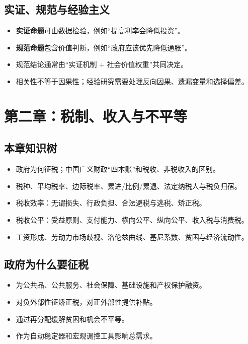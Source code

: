 \documentclass[UTF8,11pt,a4paper]{ctexart}
\newcommand{\term}[1]{\textbf{#1}}
\begin{document}
\subsection{实证、规范与经验主义}
\begin{itemize}
  \item \term{实证命题}可由数据检验，例如“提高利率会降低投资”。
  \item \term{规范命题}包含价值判断，例如“政府应该优先降低通胀”。
  \item 规范结论通常由“实证机制 + 社会价值权重”共同决定。
  \item 相关性不等于因果性；经验研究需要处理反向因果、遗漏变量和选择偏差。
\end{itemize}

\newpage
\section{第二章：税制、收入与不平等}

\subsection{本章知识树}
\begin{itemize}
  \item 政府为何征税；中国广义财政“四本账”和税收、非税收入的区别。
  \item 税种、平均税率、边际税率、累进/比例/累退、法定纳税人与税负归宿。
  \item 税收效率：无谓损失、行政负担、合法避税与逃税、矫正税。
  \item 税收公平：受益原则、支付能力、横向公平、纵向公平、收入税与消费税。
  \item 工资形成、劳动力市场歧视、洛伦兹曲线、基尼系数、贫困与经济流动性。
\end{itemize}

\subsection{政府为什么要征税}
\begin{itemize}
  \item 为公共品、公共服务、社会保障、基础设施和产权保护融资。
  \item 对负外部性征矫正税，对正外部性提供补贴。
  \item 通过再分配缓解贫困和机会不平等。
  \item 作为自动稳定器和宏观调控工具影响总需求。
\end{itemize}
\end{document}
